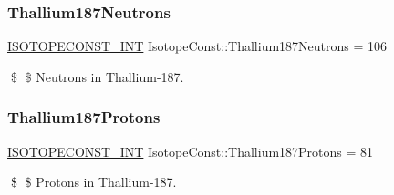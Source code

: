 \subsubsection{\texorpdfstring{Thallium187\+Neutrons}{Thallium187Neutrons}}
{\footnotesize\ttfamily \mbox{\hyperlink{group___isotope_const-_macros_ga5f18360b3e99483a35c32d789e62621c}{I\+S\+O\+T\+O\+P\+E\+C\+O\+N\+S\+T\+\_\+\+I\+NT}} Isotope\+Const\+::\+Thallium187\+Neutrons = 106}

\$ \$ Neutrons in Thallium-\/187. \mbox{\label{group___isotope_const-_thallium-_tl187_ga46f603453d3ac5b3b6baf57992b87656}} 
\subsubsection{\texorpdfstring{Thallium187\+Protons}{Thallium187Protons}}
{\footnotesize\ttfamily \mbox{\hyperlink{group___isotope_const-_macros_ga5f18360b3e99483a35c32d789e62621c}{I\+S\+O\+T\+O\+P\+E\+C\+O\+N\+S\+T\+\_\+\+I\+NT}} Isotope\+Const\+::\+Thallium187\+Protons = 81}

\$ \$ Protons in Thallium-\/187. 